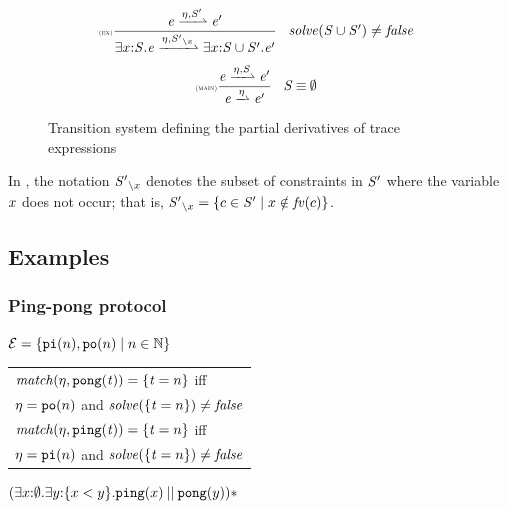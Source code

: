 \begin{figure}[t]
$$\begin{array}{c}
   \Rule{ex}{\re\parDer{\ev,\cts'}\re'}{\existOp{\var}{\cts}{\re}\parDer{\ev,\excl{\var}{\cts'}}\existOp{\var}{\ctsconj{\cts}{\cts'}}{\re'}}{%
    \sol(\ctsconj{\cts}{\cts'})\neq\false
   }                                                                                                        \\[4ex]
   \Rule{main}{\re\parDer{\ev,\cts}\re'}{\re\parDer{\ev}\re'}{\cts\mathbin{\equiv}\emptyset}
  \end{array}
 $$
 \caption{Transition system defining the partial derivatives of trace expressions}
 \label{fig:parDer}
\end{figure}

In , the notation ${\mathit {S}'}_{\setminus{x}}$ denotes the subset of constraints in $\mathit {S}'$ where the variable $x$ does not occur; that is, ${\mathit {S}'}_{\setminus{x}}=\{c \in \mathit {S}' \mid x \notin \mathit{fv}(c)\}$.


\subsection{Examples}

\subsubsection*{Ping-pong protocol}

$\mathcal{E}=\{\mathtt {pi}(n),\mathtt {po}(n) \mid n \in \mathbb{N}\}$

\begin{tabular}{l}
 $\mathit{match}(\eta,\mathtt {pong}(\mathit {t}))=\{\mathit {t} = n\}$ iff \\ \qquad $\eta=\mathtt {po}(n)$ and $\mathit{solve}(\{\mathit {t} = n\})\neq\mathit{false}$ \\
 $\mathit{match}(\eta,\mathtt {ping}(\mathit {t}))=\{\mathit {t} = n\}$ iff \\ \qquad$\eta=\mathtt {pi}(n)$ and $\mathit{solve}(\{\mathit {t} = n\})\neq\mathit{false}$
\end{tabular}

${{(\exists{x}{:}{\emptyset}{.}{\exists{y}{:}{\{x< y\}}{.}{\ensuremath{\mathtt {ping}}(x)\mathbin{||}\ensuremath{\mathtt {pong}}(y)}})}{*}}$